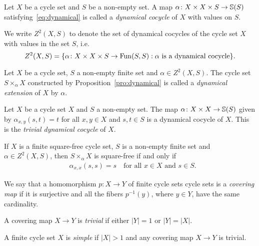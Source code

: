 \begin{definition}
	Let $X$ be a cycle set and $S$ be a non-empty set.  A map
	$\alpha\colon X\times X\times S\to\mathbb{S}(S)$ satisfying~\eqref{eq:dynamical} is
	called a \emph{dynamical cocycle} of $X$ with values on $S$.  
\end{definition}

We write $Z^2(X,S)$ to denote the set of dynamical cocycles of the 
cycle set $X$ with values in the set $S$, i.e.  
\[
	Z^2(X,S)=\{\alpha\colon X\times X\times S\to\operatorname{Fun}(S,S):\alpha\text{ is a dynamical cocycle}\}.
\]

\begin{definition}
	Let $X$ be a cycle set, $S$ a non-empty finite set and $\alpha\in Z^2(X,S)$.
	The cycle set $S\times_\alpha X$ constructed by Proposition~\ref{pro:dynamical}
	is called a \emph{dynamical extension} of $X$ by $\alpha$. 
\end{definition}

\begin{example}
	Let $X$ be a cycle set $X$ and $S$ a non-empty set. The map
	$\alpha\colon X\times X\to\mathbb{S}(S)$ given by $\alpha_{x,y}(s,t)=t$ for all
	$x,y\in X$ and $s,t\in S$ is a dynamical cocycle of $X$. This is the
	\emph{trivial dynamical cocycle} of $X$. 
\end{example}

If $X$ is a finite square-free cycle set, $S$ is a non-empty finite set and
$\alpha\in Z^2(X,S)$, then $S\times_\alpha X$ is square-free if and only if 
\begin{equation*}
	\begin{aligned}
		&\alpha_{x,x}(s,s)=s\quad
		\text{for all $x\in X$ and $s\in S$.}
	\end{aligned}
\end{equation*}

\begin{definition}
	We say that a homomorphism $p\colon X\to Y$ of finite cycle sets 
	cycle sets is a \emph{covering map} if it is surjective and all the fibers
	$p^{-1}(y)$, where $y\in Y$, have the same cardinality. 
\end{definition}

\begin{definition}
	A covering map $X\to Y$ is \emph{trivial} if either $|Y|=1$ or $|Y|=|X|$. 
\end{definition}


\begin{definition}
	A finite cycle set $X$ is \emph{simple} if $|X|>1$ and any covering map
	$X\to Y$ is trivial. 
\end{definition}

